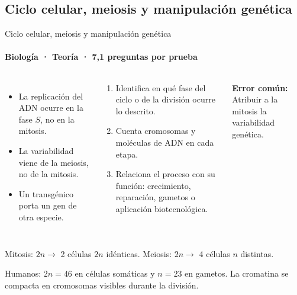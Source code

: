 \documentclass[aspectratio=169,11pt]{beamer}
\newlength{\ajustealto}
\newenvironment{ajustar}[1][0.74\textheight]
  {\setlength{\ajustealto}{#1}\begin{lrbox}{\ajustecaja}\begin{minipage}{\textwidth}}
  {\end{minipage}\end{lrbox}%
   \ifdim\dimexpr\ht\ajustecaja+\dp\ajustecaja\relax>\ajustealto
     \resizebox*{!}{\ajustealto}{\usebox{\ajustecaja}}\else\usebox{\ajustecaja}\fi}
\begin{document}
\subsection{Ciclo celular, meiosis y manipulación genética}

\begin{frame}{Ciclo celular, meiosis y manipulación genética}
\label{tema-cs-genetica}
\framesubtitle{Biología · Teoría · 7,1 preguntas por prueba}
\begin{ajustar}
\begin{columns}[T,onlytextwidth]
\begin{itemize}\footnotesize
\item La replicación del ADN ocurre en la fase $S$, no en la mitosis.
\item La variabilidad viene de la meiosis, no de la mitosis.
\item Un transgénico porta un gen de otra especie.
\end{itemize}
\begin{cajaregla}\scriptsize \begin{enumerate}\item Identifica en qué fase del ciclo o de la división ocurre lo descrito.\item Cuenta cromosomas y moléculas de ADN en cada etapa.\item Relaciona el proceso con su función: crecimiento, reparación, gametos o aplicación biotecnológica.\end{enumerate}\end{cajaregla}
\begin{notagris}\scriptsize \textbf{Error común:} Atribuir a la mitosis la variabilidad genética.\end{notagris}
\end{columns}
\begin{cajaclave}\footnotesize
Mitosis: $2n\rightarrow$ 2 células $2n$ idénticas. Meiosis: $2n\rightarrow$ 4 células $n$ distintas.

Humanos: $2n=46$ en células somáticas y $n=23$ en gametos. La cromatina se compacta en cromosomas visibles durante la división.
\end{cajaclave}
\end{ajustar}
\end{frame}
\end{document}
